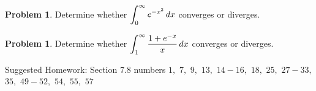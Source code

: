 \documentclass[letterpaper, twoside, 12pt]{book}
\theoremstyle{definition}
\theoremstyle{definition}
\newtheorem{problem}[theorem]{Problem}
\newcommand{\ds}{\ensuremath{\displaystyle}}
\begin{document}
\begin{problem}
  Determine whether $\ds \int_0^\infty e^{-x^2} \, dx$ converges or diverges.
\end{problem}

\vfill

\begin{problem}
  Determine whether $\ds \int_1^\infty \frac{1+e^{-x}}{x} \, dx$
  converges or diverges.
\end{problem}

\vfill

\noindent Suggested Homework: Section $7.8$ numbers $1,$ $7,$ $9,$ $13,$ $14 - 16,$ $18,$ $25,$ $27 - 33,$ $35,$ $49 - 52,$ $54,$ $55,$ $57$
\end{document}
